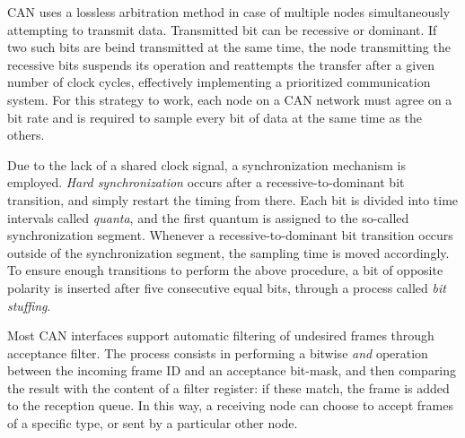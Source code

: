 CAN uses a lossless arbitration method in case of multiple nodes simultaneously attempting to transmit data.
Transmitted bit can be recessive or dominant.
If two such bits are beind transmitted at the same time, the node transmitting the recessive bits suspends its operation and reattempts the transfer after a given number of clock cycles, effectively implementing a prioritized communication system.
For this strategy to work, each node on a CAN network must agree on a bit rate and is required to sample every bit of data at the same time as the others.

Due to the lack of a shared clock signal, a synchronization mechanism is employed.
\emph{Hard synchronization} occurs after a recessive-to-dominant bit transition, and simply restart the timing from there.
Each bit is divided into time intervals called \emph{quanta}, and the first quantum is assigned to the so-called synchronization segment.
Whenever a recessive-to-dominant bit transition occurs outside of the synchronization segment, the sampling time is moved accordingly.
To ensure enough transitions to perform the above procedure, a bit of opposite polarity is inserted after five consecutive equal bits, through a process called \emph{bit stuffing}.


Most CAN interfaces support automatic filtering of undesired frames through acceptance filter.
The process consists in performing a bitwise \emph{and} operation between the incoming frame ID and an acceptance bit-mask, and then comparing the result with the content of a filter register: if these match, the frame is added to the reception queue.
In this way, a receiving node can choose to accept frames of a specific type, or sent by a particular other node.

